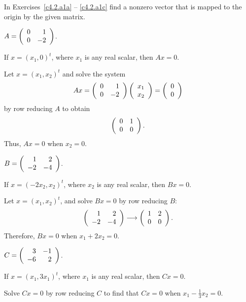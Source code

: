 \documentclass{ximera}
\begin{document}
\noindent In Exercises~\ref{c4.2.a1a} -- \ref{c4.2.a1c} find a nonzero
vector that is mapped to the origin by the given matrix.
\begin{exercise} \label{c4.2.a1a}
$A=\left(\begin{array}{rr} 0 & 1\\ 0 &-2\end{array}\right)$.

\begin{solution}

\ans If $x = (x_1,0)^t$, where $x_1$ is any real scalar, then $Ax = 0$.

\soln Let $x = (x_1,x_2)^t$ and solve the system
\[
Ax = \left(\begin{array}{rr} 0 & 1\\ 0 &-2\end{array}\right)\left(\begin{array}{r} x_1 \\ x_2\end{array}\right) = \left(\begin{array}{r} 0 \\ 0\end{array}\right)
\]
by row reducing $A$ to obtain
\[
\left(\begin{array}{rr} 0 & 1\\ 0 &0\end{array}\right).
\]
Thus, $Ax = 0$ when $x_2 = 0$.

\end{solution}
\end{exercise}
\begin{exercise} \label{c4.2.a1b}
$B=\left(\begin{array}{rr} 1 & 2\\ -2 &-4\end{array}\right)$.

\begin{solution}
\ans  If $x = (-2x_2,x_2)^t$, where $x_2$ is any real
scalar, then $Bx = 0$.

\soln Let $x = (x_1,x_2)^t$, and solve $Bx = 0$ by row reducing $B$:
\[
\left(\begin{array}{rr} 1 & 2\\ -2 &-4\end{array}\right) \longrightarrow \left(\begin{array}{rr} 1 & 2\\ 0 &0\end{array}\right).
\]
Therefore, $Bx = 0$ when $x_1 + 2x_2 = 0$.

\end{solution}
\end{exercise}
\begin{exercise} \label{c4.2.a1c}
$C=\left(\begin{array}{rr} 3 & -1\\ -6 &2\end{array}\right)$.

\begin{solution}

\ans If $x = (x_1,3x_1)^t$, where $x_1$ is any real scalar, then $Cx = 0$.

\soln Solve $Cx = 0$ by row reducing $C$ to find that $Cx = 0$ when
$x_1 - \frac{1}{3}x_2 = 0$.

\end{solution}
\end{exercise}
\end{document}
